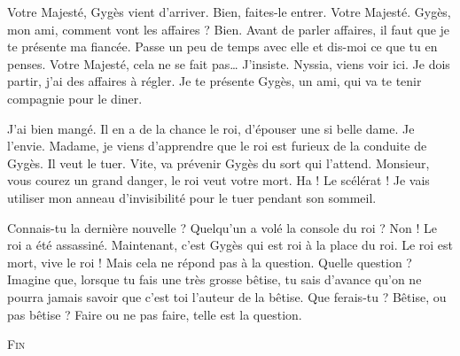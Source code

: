 \documentclass[12pt, a5paper, french]{memoir}
\begin{document}
\begin{linenumbers}
\begin{drama}
\scene[Nyssia]
\StageDir{\Gyges, \Candaule, \Nyssia, \Laurel}
\Laurelspeaks Votre Majesté, Gygès vient d’arriver.
\Candaulespeaks Bien, faites-le entrer.
\Gygesspeaks Votre Majesté.
\Candaulespeaks Gygès, mon ami, comment vont les affaires ?
\Gygesspeaks Bien.
\Candaulespeaks Avant de parler affaires, il faut que je te présente ma fiancée. Passe un peu de temps avec elle et dis-moi ce que tu en penses.
\Gygesspeaks Votre Majesté, cela ne se fait pas\dots
\Candaulespeaks J’insiste.  Nyssia, viens voir ici. Je dois partir, j’ai des affaires à régler. Je te présente Gygès, un ami, qui va te tenir compagnie pour le diner.
\newpage

\scene[L’assassinat]
\StageDir{\Gyges, \Nyssia, \Hardy}
\Gygesspeaks {} J’ai bien mangé. Il en a de la chance le roi, d’épouser une si belle dame. Je l’envie.
\Hardyspeaks Madame, je viens d’apprendre que le roi est furieux de la conduite de Gygès. Il veut le tuer.
\Nyssiaspeaks Vite, va prévenir Gygès du sort qui l’attend.
\Hardyspeaks Monsieur, vous courez un grand danger, le roi veut votre mort.
\Gygesspeaks Ha ! Le scélérat ! Je vais utiliser mon anneau d’invisibilité pour le tuer pendant son sommeil.
\newpage

\scene[La question]
\StageDir{\Bonnie, \Clyde}
\Bonniespeaks Connais-tu la dernière nouvelle ?
\Clydespeaks Quelqu’un a volé la console du roi ?
\Bonniespeaks Non ! Le roi a été assassiné. Maintenant, c’est Gygès qui est roi à la place du roi.
\Clydespeaks Le roi est mort, vive le roi !
\Bonniespeaks Mais cela ne répond pas à la question.
\Clydespeaks Quelle question ?
\Bonniespeaks Imagine que, lorsque tu fais une très grosse bêtise, tu sais d’avance qu’on ne pourra jamais savoir que c’est toi l’auteur de la bêtise. Que ferais-tu ? Bêtise, ou pas bêtise ? Faire ou ne pas faire, telle est la question.

\end{drama}
\end{linenumbers}

\centering
\vfill
\textsc{Fin}
\vfill
\thispagestyle{empty}
\end{document}
